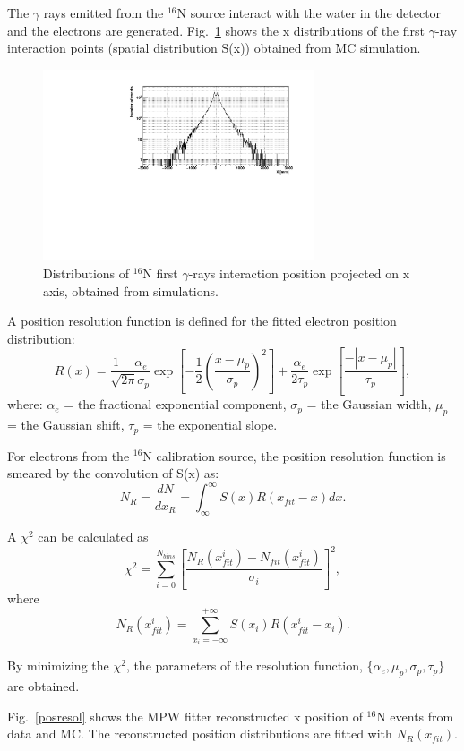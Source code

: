 \documentclass[preprint,12pt]{elsarticle}
\numberwithin{equation}{section}
\begin{document}
The $\gamma$ rays emitted from the $^{16}$N source interact with the water in the detector and the electrons are generated. Fig.~\ref{hsx} shows the x distributions of the first $\gamma$-ray interaction points (spatial distribution S(x)) obtained from MC simulation.

\begin{figure}[!htb]
	\centering
	\includegraphics[width=8cm]{sx.pdf}
	\caption{Distributions of {$^{16}$}N first $\gamma$-rays interaction position projected on x axis, obtained from simulations.}
	\label{hsx}
\end{figure}

A position resolution function is defined for the fitted electron position distribution\cite{boulay}:
\[
  R(x)=\frac{1-\alpha_e}{\sqrt{2\pi}\sigma_p}\exp{[-\frac{1}{2}(\frac{x-\mu_p}{\sigma_p})^2]+\frac{\alpha_e}{2\tau_p}\exp{[\frac{-|x-\mu_p|}{\tau_p}]}},
\]
where: $\alpha_e$ = the fractional exponential component, $\sigma_p$ =
the Gaussian width, $\mu_p$ = the Gaussian shift, $\tau_p$ = the
exponential slope.

For electrons from the $^{16}$N calibration source, the position resolution function is smeared by the convolution of S(x) as:
\[
  N_{R}=\frac{dN}{dx_R}=\int^\infty_\infty S(x)R(x_{fit}-x)dx.
\]

A $\chi^2$ can be calculated as
\[
  \chi^2=\sum^{N_{bins}}_{i=0}[\frac{N_R(x_{fit}^i)-N_{fit}(x_{fit}^i)}{\sigma_i}]^2,
\]
where
\[N_R(x_{fit}^i)=\sum_{x_i=-\infty}^{+\infty}S(x_i)R(x_{fit}^i-x_i).\]

By minimizing the $\chi^2$, the parameters of the resolution function, $\{\alpha_e,\mu_p,\sigma_p,\tau_p\}$ are obtained.

Fig.~\ref{posresol} shows the MPW fitter reconstructed x position of {$^{16}$}N events from data and MC. The reconstructed position distributions are fitted with $N_R(x_{fit})$.
\end{document}

